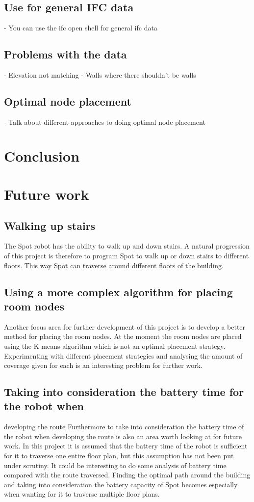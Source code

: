 \subsection{Use for general IFC data}
- You can use the ifc open shell for general ifc data

\subsection{Problems with the data}
- Elevation not matching
- Walls where there shouldn't be walls


\subsection{Optimal node placement}
- Talk about different approaches to doing optimal node placement

\section{Conclusion}

\section{Future work}\label{Future_work}
\subsection{Walking up stairs}
The Spot robot has the ability to walk up and down stairs. A natural progression of this project is therefore to program Spot to walk up or down stairs to different floors. This way Spot can traverse around different floors of the building.

\subsection{Using a more complex algorithm for placing room nodes}
Another focus area for further development of this project is to develop a better method for placing the room nodes. At the moment the room nodes are placed using the K-means algorithm which is not an optimal placement strategy. Experimenting with different placement strategies and analysing the amount of coverage given for each is an interesting problem for further work.

\subsection{Taking into consideration the battery time for the robot when} developing the route
Furthermore to take into consideration the battery time of the robot when developing the route is also an area worth looking at for future work. In this project it is assumed that the battery time of the robot is sufficient for it to traverse one entire floor plan, but this assumption has not been put under scrutiny. It could be interesting to do some analysis of battery time compared with the route traversed. Finding the optimal path around the building and taking into consideration the battery capacity of Spot becomes especially when wanting for it to traverse multiple floor plans.

